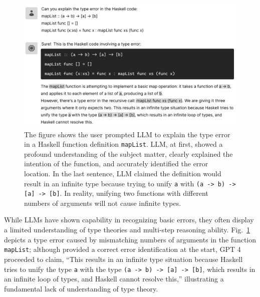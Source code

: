 \begin{figure}[hbt]
  \includegraphics[width=\linewidth]{LLM}
  \caption[LLM explaining a type error; it began very accurate, then went on to give incorrect and contradicting analysis]{\label{fig:llm}
  The figure shows the user prompted LLM to explain the type error in a Haskell function definition \texttt{mapList}. LLM, at first, showed a profound understanding of the subject matter, clearly explained the intention of the function, and accurately identified the error location. In the last sentence, LLM claimed the definition would result in an infinite type because trying to unify \texttt{a} with \texttt{(a -> b) -> [a] -> [b]}. In reality, unifying two functions with different numbers of arguments will not cause infinite types. 
    }
\end{figure}

While LLMs have shown capability in recognizing basic errors, they often display a limited understanding of type theories and multi-step reasoning ability. Fig.~\ref{fig:llm} depicts a type error caused by mismatching numbers of arguments in the function \texttt{mapList}; although provided a correct error identification at the start, GPT 4 proceeded to claim, “This results in an infinite type situation because Haskell tries to unify the type \texttt{a} with the type \texttt{(a -> b) -> [a] -> [b]}, which results in an infinite loop of types, and Haskell cannot resolve this,” illustrating a fundamental lack of understanding of type theory.


